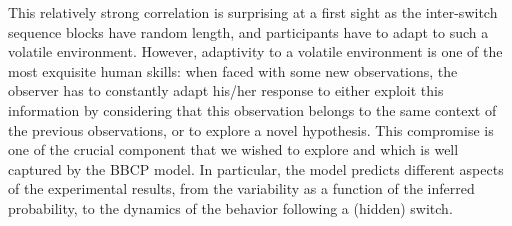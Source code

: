\documentclass[12pt,english]{article}%
\begin{document}
This relatively strong correlation is surprising at a first sight
as the inter-switch sequence blocks have random length,
and participants have to adapt to such a volatile environment.
However, adaptivity to a volatile environment is one of the most exquisite human skills: 
when faced with some new observations,
the observer has to constantly adapt his/her response
to either exploit this information by considering that
this observation belongs to the same context of the previous observations, or to explore
a novel hypothesis.
This compromise is one of the crucial component that we wished to explore
and which is well captured by the BBCP model.
In particular, the model predicts different aspects
of the experimental results,
from the variability as a function of the inferred probability,
to the dynamics of the behavior following a (hidden) switch.
\end{document}
